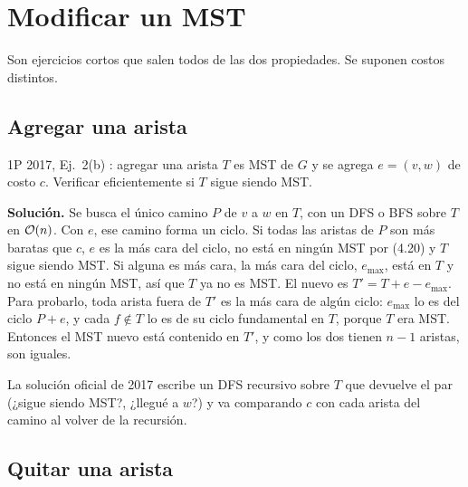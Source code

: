 \section{Modificar un MST}

Son ejercicios cortos que salen todos de las dos propiedades. Se suponen costos distintos.

\subsection{Agregar una arista}

\begin{problema}{1P 2017, Ej.~2(b) : agregar una arista}
$T$ es MST de $G$ y se agrega $e=(v,w)$ de costo $c$. Verificar eficientemente si $T$ sigue siendo MST.

\smallskip
\textbf{Solución.} Se busca el único camino $P$ de $v$ a $w$ en $T$, con un DFS o BFS sobre $T$ en $\mathcal{O}(n)$. Con $e$, ese camino forma un ciclo. Si todas las aristas de $P$ son más baratas que $c$, $e$ es la más cara del ciclo, no está en ningún MST por (4.20) y $T$ sigue siendo MST. Si alguna es más cara, la más cara del ciclo, $e_{\max}$, está en $T$ y no está en ningún MST, así que $T$ ya no es MST. El nuevo es $T'=T+e-e_{\max}$. Para probarlo, toda arista fuera de $T'$ es la más cara de algún ciclo: $e_{\max}$ lo es del ciclo $P+e$, y cada $f\notin T$ lo es de su ciclo fundamental en $T$, porque $T$ era MST. Entonces el MST nuevo está contenido en $T'$, y como los dos tienen $n-1$ aristas, son iguales.
\end{problema}

La solución oficial de 2017 escribe un DFS recursivo sobre $T$ que devuelve el par (¿sigue siendo MST?, ¿llegué a $w$?) y va comparando $c$ con cada arista del camino al volver de la recursión.

\subsection{Quitar una arista}

